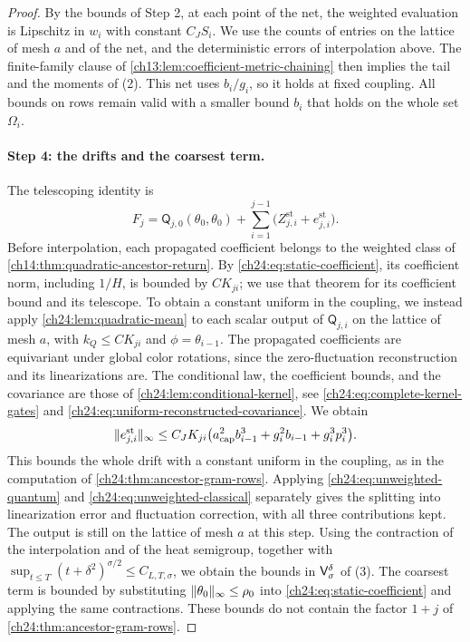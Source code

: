 \begin{proof}
By the bounds of Step 2, at each point of the net, the weighted evaluation is Lipschitz in $w_i$ with constant $C_JS_i$. We use the counts of entries on the lattice of mesh $a$ and of the net, and the deterministic errors of interpolation above. The finite-family clause of \cref{ch13:lem:coefficient-metric-chaining} then implies the tail and the moments of (2). This net uses $b_i/g_i$, so it holds at fixed coupling. All bounds on rows remain valid with a smaller bound $b_i$ that holds on the whole set $\Omega_i$.

\paragraph{Step 4: the drifts and the coarsest term.}
The telescoping identity is
\begin{equation}\label{ch24:eq:static-telescope}
 F_j=\mathsf Q_{j,0}(\theta_0,\theta_0)+\sum_{i=1}^{j-1}\bigl(Z_{j,i}^{\mathrm{st}}+e_{j,i}^{\mathrm{st}}\bigr).
\end{equation}
Before interpolation, each propagated coefficient belongs to the weighted class of \cref{ch14:thm:quadratic-ancestor-return}. By \eqref{ch24:eq:static-coefficient}, its coefficient norm, including $1/H$, is bounded by $CK_{ji}$; we use that theorem for its coefficient bound and its telescope. To obtain a constant uniform in the coupling, we instead apply \cref{ch24:lem:quadratic-mean} to each scalar output of $\mathsf Q_{j,i}$ on the lattice of mesh $a$, with $k_Q\le CK_{ji}$ and $\phi=\theta_{i-1}$. The propagated coefficients are equivariant under global color rotations, since the zero-fluctuation reconstruction and its linearizations are. The conditional law, the coefficient bounds, and the covariance are those of \cref{ch24:lem:conditional-kernel}, see \eqref{ch24:eq:complete-kernel-gates} and \eqref{ch24:eq:uniform-reconstructed-covariance}. We obtain
\begin{equation}\label{ch24:eq:uniform-static-mean}
 \lVert e_{j,i}^{\mathrm{st}}\rVert_\infty\le C_JK_{ji}\bigl(a_{\mathrm{cap}}^2b_{i-1}^3+g_i^2b_{i-1}+g_i^3p_i^3\bigr).
\end{equation}
This bounds the whole drift with a constant uniform in the coupling, as in the computation of \cref{ch24:thm:ancestor-gram-rows}. Applying \eqref{ch24:eq:unweighted-quantum} and \eqref{ch24:eq:unweighted-classical} separately gives the splitting into linearization error and fluctuation correction, with all three contributions kept. The output is still on the lattice of mesh $a$ at this step. Using the contraction of the interpolation and of the heat semigroup, together with $\sup_{t\le T}(t+\delta^2)^{\sigma/2}\le C_{L,T,\sigma}$, we obtain the bounds in $\mathsf V_{\sigma}^{\delta}$ of (3). The coarsest term is bounded by substituting $\lVert \theta_0\rVert_\infty\le\rho_0$ into \eqref{ch24:eq:static-coefficient} and applying the same contractions. These bounds do not contain the factor $1+j$ of \cref{ch24:thm:ancestor-gram-rows}.


\end{proof}
